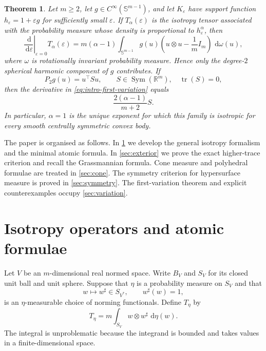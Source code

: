 \documentclass[11pt,a4paper]{amsart}
\numberwithin{equation}{section}
\theoremstyle{plain}
\newtheorem{maintheorem}{Theorem}
\theoremstyle{definition}
\theoremstyle{remark}
\DeclareMathOperator{\Sym}{Sym}
\DeclareMathOperator{\tr}{tr}
\newcommand{\R}{\mathbb{R}}
\newcommand{\dd}{\,\mathrm{d}}
\newcommand{\Id}{I}
\newcommand{\sphere}{\mathbb{S}}
\begin{document}
\begin{maintheorem}\label{thm:intro-D}
Let $m\geqslant2$, let $g\in C^\infty(\sphere^{m-1})$, and let $K_\varepsilon$ have support function $h_\varepsilon=1+\varepsilon g$ for sufficiently small $\varepsilon$. If $T_\alpha(\varepsilon)$ is the isotropy tensor associated with the probability measure whose density is proportional to $h_\varepsilon^\alpha$, then
\begin{equation}\label{eq:intro-first-variation}
\left.\frac{\dd}{\dd\varepsilon}\right|_{\varepsilon=0}T_\alpha(\varepsilon)
=m(\alpha-1)\int_{\sphere^{m-1}}g(u)
\left(u\otimes u-\frac1m\Id_m\right)\,\dd\omega(u),
\end{equation}
where $\omega$ is rotationally invariant probability measure. Hence only the degree-$2$ spherical harmonic component of $g$ contributes. If
\[
P_2g(u)=u^\top Su,
\qquad S\in\Sym(\R^m),\quad \tr(S)=0,
\]
then the derivative in \eqref{eq:intro-first-variation} equals
\[
\frac{2(\alpha-1)}{m+2}S.
\]
In particular, $\alpha=1$ is the unique exponent for which this family is isotropic for every smooth centrally symmetric convex body.
\end{maintheorem}

The paper is organised as follows. In \cref{sec:isotropy} we develop the general isotropy formalism and the minimal atomic formula. In \cref{sec:exterior} we prove the exact higher-trace criterion and recall the Grassmannian formula. Cone measure and polyhedral formulae are treated in \cref{sec:cone}. The symmetry criterion for hypersurface measure is proved in \cref{sec:symmetry}. The first-variation theorem and explicit counterexamples occupy \cref{sec:variation}.

\section{Isotropy operators and atomic formulae}\label{sec:isotropy}

Let $V$ be an $m$-dimensional real normed space. Write $B_V$ and $S_V$ for its closed unit ball and unit sphere. Suppose that $\eta$ is a probability measure on $S_V$ and that
\[
w\longmapsto w^\sharp\in S_{V^*},
\qquad
w^\sharp(w)=1,
\]
is an $\eta$-measurable choice of norming functionals. Define $T_\eta$ by
\begin{equation}\label{eq:T-general}
T_\eta=m\int_{S_V}w\otimes w^\sharp\,\dd\eta(w).
\end{equation}
The integral is unproblematic because the integrand is bounded and takes values in a finite-dimensional space.
\end{document}

